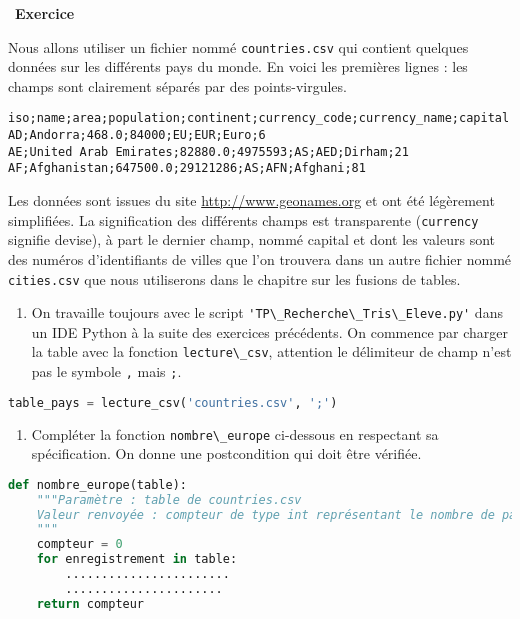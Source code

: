 \documentclass[
  11pt,
]{article}
\newcommand{\passthrough}[1]{#1}
\providecommand{\tightlist}{%
  \setlength{\itemsep}{0pt}\setlength{\parskip}{0pt}}
\newcounter{exo}
\newenvironment{exercice}[1]
{\par \medskip   \addtocounter{exo}{1} \noindent  
\begin{bclogo}[arrondi =0.1,   noborder = true, logo=\bccrayon, marge=4]{~\textbf{Exercice} \textbf{\theexo} {\itshape #1} }  \par}
{
\end{bclogo}
 \par \bigskip }
\newcounter{def}
\begin{document}
\begin{exercice}{}

Nous allons utiliser un fichier nommé
\passthrough{\lstinline!countries.csv!} qui contient quelques données
sur les différents pays du monde. En voici les premières lignes : les
champs sont clairement séparés par des points-virgules.

\begin{lstlisting}
iso;name;area;population;continent;currency_code;currency_name;capital
AD;Andorra;468.0;84000;EU;EUR;Euro;6
AE;United Arab Emirates;82880.0;4975593;AS;AED;Dirham;21
AF;Afghanistan;647500.0;29121286;AS;AFN;Afghani;81
\end{lstlisting}

Les données sont issues du site \url{http://www.geonames.org} et ont été
légèrement simplifiées. La signification des différents champs est
transparente (\passthrough{\lstinline!currency!} signifie devise), à
part le dernier champ, nommé capital et dont les valeurs sont des
numéros d'identifiants de villes que l'on trouvera dans un autre fichier
nommé \passthrough{\lstinline!cities.csv!} que nous utiliserons dans le
chapitre sur les fusions de tables.

\begin{enumerate}
\def\labelenumi{\arabic{enumi}.}
\tightlist
\item
  On travaille toujours avec le script
  \passthrough{\lstinline!'TP\_Recherche\_Tris\_Eleve.py'!} dans un IDE
  Python à la suite des exercices précédents. On commence par charger la
  table avec la fonction \passthrough{\lstinline!lecture\_csv!},
  attention le délimiteur de champ n'est pas le symbole
  \passthrough{\lstinline!,!} mais \passthrough{\lstinline!;!}.
\end{enumerate}

\begin{lstlisting}[language=Python]
table_pays = lecture_csv('countries.csv', ';')
\end{lstlisting}

\begin{enumerate}
\def\labelenumi{\arabic{enumi}.}
\setcounter{enumi}{1}
\tightlist
\item
  Compléter la fonction \passthrough{\lstinline!nombre\_europe!}
  ci-dessous en respectant sa spécification. On donne une postcondition
  qui doit être vérifiée.
\end{enumerate}

\begin{lstlisting}[language=Python]
def nombre_europe(table):
    """Paramètre : table de countries.csv
    Valeur renvoyée : compteur de type int représentant le nombre de pays du continent européen
    """
    compteur = 0
    for enregistrement in table:
        .......................
        ......................
    return compteur


\end{lstlisting}
\end{exercice}
\end{document}
